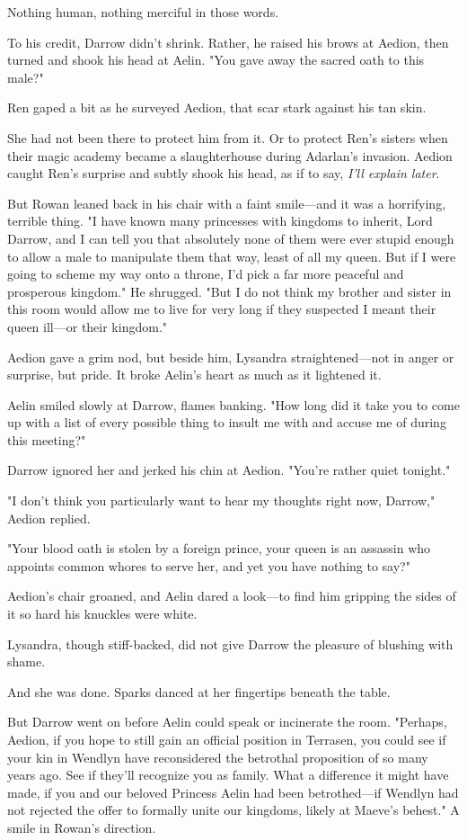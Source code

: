 Nothing human, nothing merciful in those words.

To his credit, Darrow didn't shrink. Rather, he raised his brows at Aedion, then turned and shook his head at Aelin. "You gave away the sacred oath to this  male?"

Ren gaped a bit as he surveyed Aedion, that scar stark against his tan skin.

She had not been there to protect him from it. Or to protect Ren's sisters when their magic academy became a slaughterhouse during Adarlan's invasion. Aedion caught Ren's surprise and subtly shook his head, as if to say, \emph{I'll explain later}.

But Rowan leaned back in his chair with a faint smile---and it was a horrifying, terrible thing. "I have known many princesses with kingdoms to inherit, Lord Darrow, and I can tell you that absolutely none of them were ever stupid enough to allow a male to manipulate them that way, least of all my queen. But if I were going to scheme my way onto a throne, I'd pick a far more peaceful and prosperous kingdom." He shrugged. "But I do not think my brother and sister in this room would allow me to live for very long if they suspected I meant their queen ill---or their kingdom."

Aedion gave a grim nod, but beside him, Lysandra straightened---not in anger or surprise, but pride. It broke Aelin's heart as much as it lightened it.

Aelin smiled slowly at Darrow, flames banking. "How long did it take you to come up with a list of every possible thing to insult me with and accuse me of during this meeting?"

Darrow ignored her and jerked his chin at Aedion. "You're rather quiet tonight."

"I don't think you particularly want to hear my thoughts right now, Darrow," Aedion replied.

"Your blood oath is stolen by a foreign prince, your queen is an assassin who appoints common whores to serve her, and yet you have nothing to say?"

Aedion's chair groaned, and Aelin dared a look---to find him gripping the sides of it so hard his knuckles were white.

Lysandra, though stiff-backed, did not give Darrow the pleasure of blushing with shame.

And she was done. Sparks danced at her fingertips beneath the table.

But Darrow went on before Aelin could speak or incinerate the room. "Perhaps, Aedion, if you hope to still gain an official position in Terrasen, you could see if your kin in Wendlyn have reconsidered the betrothal proposition of so many years ago. See if they'll recognize you as family. What a difference it might have made, if you and our beloved Princess Aelin had been betrothed---if Wendlyn had not rejected the offer to formally unite our kingdoms, likely at Maeve's behest." A smile in Rowan's direction.

